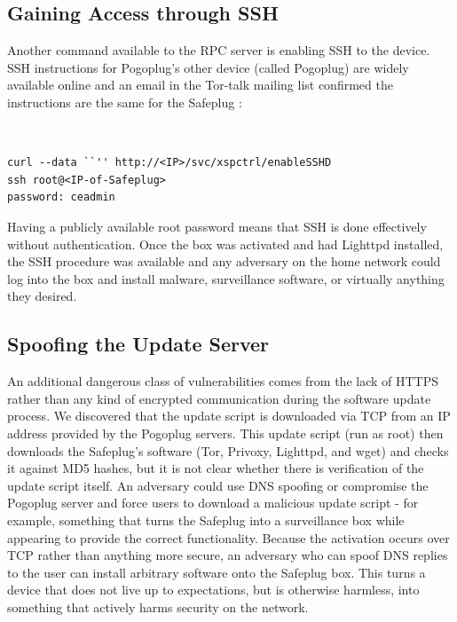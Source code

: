 \documentclass[letterpaper,twocolumn,10pt]{article}
\begin{document}
\subsection{Gaining Access through SSH}
\label{sec:SSH}
    Another command available to the RPC server is enabling SSH to the device.  SSH instructions for Pogoplug's other device (called Pogoplug) are widely available online and an email in the Tor-talk mailing list confirmed the instructions are the same for the Safeplug \cite{ceadmin}:

{\tt \small
\begin{verbatim}
curl --data ``'' http://<IP>/svc/xspctrl/enableSSHD
ssh root@<IP-of-Safeplug>
password: ceadmin
\end{verbatim}
}

Having a publicly available root password means that SSH is done effectively without authentication.  Once the box was activated and had Lighttpd installed, the SSH procedure was available and any adversary on the home network could log into the box and install malware, surveillance software, or virtually anything they desired.

\subsection{Spoofing the Update Server}
\label{dnsspoof}
An additional dangerous class of vulnerabilities comes from the lack of HTTPS rather than any kind of encrypted communication during the software update process.  We discovered that the update script is downloaded via TCP from an IP address provided by the Pogoplug servers.  This update script (run as root) then downloads the Safeplug's software (Tor, Privoxy, Lighttpd, and wget) and checks it against MD5 hashes, but it is not clear whether there is verification of the update script itself.  An adversary could use DNS spoofing or compromise the Pogoplug server and force users to download a malicious update script - for example, something that turns the Safeplug into a surveillance box while appearing to provide the correct functionality.  Because the activation occurs over TCP rather than anything more secure, an adversary who can spoof DNS replies to the user can install arbitrary software onto the Safeplug box.  This turns a device that does not live up to expectations, but is otherwise harmless, into something that actively harms security on the network.
\end{document}
